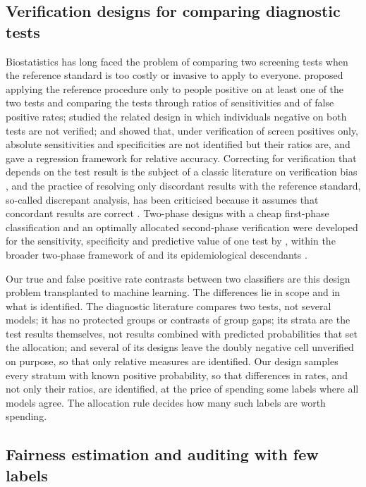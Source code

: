 \documentclass[pdflatex,sn-mathphys-num,iicol]{sn-jnl}
\theoremstyle{thmstyleone}
\theoremstyle{thmstyletwo}
\theoremstyle{thmstylethree}
\begin{document}
\subsection{Verification designs for comparing diagnostic tests}

Biostatistics has long faced the problem of comparing two screening tests when the reference standard is too costly or invasive to apply to everyone. \citet{schatzkin1987} proposed applying the reference procedure only to people positive on at least one of the two tests and comparing the tests through ratios of sensitivities and of false positive rates; \citet{chock1997} studied the related design in which individuals negative on both tests are not verified; and \citet{pepe2001comparing} showed that, under verification of screen positives only, absolute sensitivities and specificities are not identified but their ratios are, and gave a regression framework for relative accuracy. Correcting for verification that depends on the test result is the subject of a classic literature on verification bias \citep{begg1983}, and the practice of resolving only discordant results with the reference standard, so-called discrepant analysis, has been criticised because it assumes that concordant results are correct \citep{hadgu1996}. Two-phase designs with a cheap first-phase classification and an optimally allocated second-phase verification were developed for the sensitivity, specificity and predictive value of one test by \citet{mcnamee2002}, within the broader two-phase framework of \citet{neyman1938} and its epidemiological descendants \citep{breslow1988,reilly1995}.

Our true and false positive rate contrasts between two classifiers are this design problem transplanted to machine learning. The differences lie in scope and in what is identified. The diagnostic literature compares two tests, not several models; it has no protected groups or contrasts of group gaps; its strata are the test results themselves, not results combined with predicted probabilities that set the allocation; and several of its designs leave the doubly negative cell unverified on purpose, so that only relative measures are identified. Our design samples every stratum with known positive probability, so that differences in rates, and not only their ratios, are identified, at the price of spending some labels where all models agree. The allocation rule decides how many such labels are worth spending.

\subsection{Fairness estimation and auditing with few labels}
\end{document}
